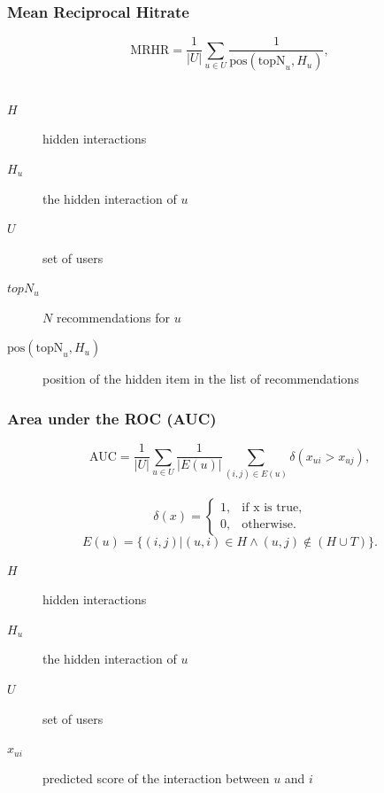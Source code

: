 \documentclass{beamer}
\begin{document}
\begin{frame} 
    \frametitle{Mean Reciprocal Hitrate~\cite{DBLP:conf/icdm/NingK11}}
\begin{equation} 
\text{MRHR}=\frac{1}{|U|} \sum_{u \in U} \frac{1}{\text{pos}(\text{topN}_{u},H_{u})},
\end{equation}\\
\vspace{6.4mm}
\begin{description}
    \item[$H$] hidden interactions\\
    \item[$H_u$] the hidden interaction of $u$\\
    \item[$U$] set of users
    \item[$topN_u$] $N$ recommendations for $u$
    \item[$\text{pos}(\text{topN}_{u},H_{u})$] position of the hidden item in the list of recommendations
\end{description}
\end{frame}

\begin{frame} 
    \frametitle{Area under the ROC (AUC)~\cite{Rendle:2009:BBP:1795114.1795167}}
\begin{equation} 
\text{AUC}=\frac{1}{|U|}\sum_{u \in U} \frac{1}{|E(u)|} 
\sum_{(i,j) \in E(u)} \delta(x_{ui}>x_{uj}),
\end{equation}\\
\begin{equation}
\delta(x)=\begin{cases}1, & \text{if x is true}, \\
                       0, & \text{otherwise.}
\end{cases}
\end{equation}
\begin{equation}
E(u) =\{(i,j)|(u,i) \in H \land (u,j) \not\in (H \cup T)\}.
\end{equation}
\begin{description}
    \item[$H$] hidden interactions\\
    \item[$H_u$] the hidden interaction of $u$\\
    \item[$U$] set of users
    \item[$x_{ui}$] predicted score of the interaction between $u$ and $i$
\end{description}
\end{frame}
\end{document}

